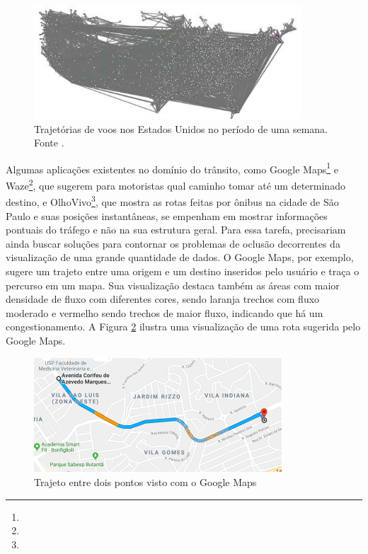 \begin{figure}[!htb]
  \centering
  \includegraphics[width=100mm]{../figuras/cluttered-map.png}
  \caption[Trajetórias de voos nos Estados Unidos]{Trajetórias de voos nos Estados Unidos no período de uma semana. Fonte \citet{Zhou2013}.}
  \label{fig:exemplo-oclusao}
\end{figure}

  Algumas aplicações existentes no domínio do trânsito, como Google
Maps\footnote{} e
Waze\footnote{}, que sugerem para motoristas qual
caminho tomar até um determinado destino, e
OlhoVivo\footnote{}, que  mostra as rotas feitas
por ônibus na cidade de São Paulo e suas posições instantâneas, se empenham em
mostrar informações pontuais do tráfego e não na sua estrutura geral. Para essa
tarefa, precisariam ainda buscar soluções para contornar os problemas de
oclusão decorrentes da visualização de uma grande quantidade de dados. O Google
Maps, por exemplo, sugere um trajeto entre uma origem e um destino inseridos
pelo usuário e traça o percurso em um mapa. Sua visualização destaca também as
áreas com maior densidade de fluxo com diferentes cores, sendo laranja trechos
com fluxo moderado e vermelho sendo trechos de maior fluxo, indicando que há um
congestionamento. A Figura \ref{fig:gmaps} ilustra uma visualização de uma rota
sugerida pelo Google Maps.

\begin{figure}[!htb]
  \centering
  \includegraphics[width=\textwidth]{../figuras/maps.pdf}
  \caption{Trajeto entre dois pontos visto com o Google Maps \label{fig:gmaps}}
\end{figure}

